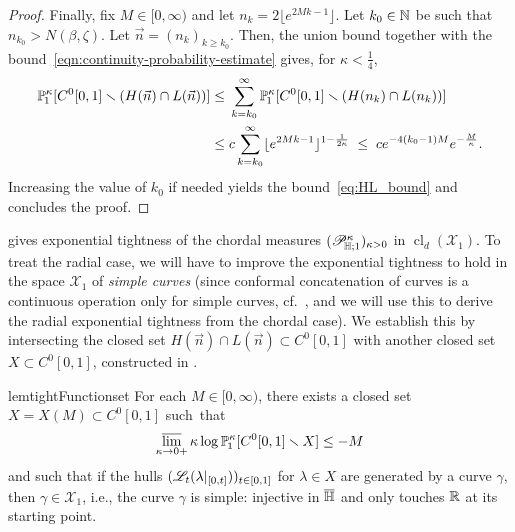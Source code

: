 \documentclass[a4paper, 11pt]{article}
\theoremstyle{definition}
\numberwithin{equation}{section}
\numberwithin{figure}{section}
\renewcommand{\limsup}{\varlimsup}
\newcommand{\cLoewnerTransform}[1][]{\mathscr{L}_{\ifx&#1&\else#1\fi}}
\newcommand{\funs}[2][]{C^{0}_{#1}[0,#2}
\newcommand{\Hpaths}[1][]{\mathscr{X}_{#1}} %
\newcommand{\Hpathscl}[1][]{\operatorname{cl}_{d}(\Hpaths[#1])}
\newcommand{\cHmeasure}[2][]{\mathscr{P}^{#2}_{\!\bH;#1}}
\newcommand{\BMmeasure}[2][]{\bP^{#2}_{\!#1}}
\begin{document}
\begin{proof}
Finally, fix $M \in [0,\infty)$ and let $n_k = 2\lfloor e^{2Mk-1} \rfloor$. Let $k_0 \in \mathbb{N}$ be such that $n_{k_0} > N(\beta,\zeta)$. 
Let $\vec n = (n_k)_{k \ge k_0}$. 
Then, the union bound together with the bound~\eqref{eqn:continuity-probability-estimate} gives, for $\kappa < \frac{1}{4}$,
\begin{align*}
\BMmeasure[1]{\kappa}[ \funs{1]} \smallsetminus (H(\vec n) \cap L(\vec n)) ] 
\le\;& \sum_{k=k_0}^\infty 
\BMmeasure[1]{\kappa}[ \funs{1]} \smallsetminus (H(n_k) \cap L(n_k)) ] \\
\le\;& c\sum_{k=k_0}^\infty \lfloor e^{2Mk-1} \rfloor^{1-\frac{1}{2\kappa}} 
\; \le\; ce^{-4(k_0-1)M}e^{-\frac{M}{\kappa}}.
\end{align*}
Increasing the value of $k_0$ if needed 
yields the bound~\eqref{eq:HL_bound} and concludes the proof. 
\end{proof}


 gives exponential tightness of the chordal measures $(\cHmeasure[1]{\kappa})_{\kappa > 0}$ in $\Hpathscl[1]$. 
To treat the radial case, we will have to improve the exponential tightness to hold in the space $\Hpaths[1]$ of \emph{simple curves} 
(since conformal concatenation of curves is a continuous operation only for simple curves, cf.~, 
and we will use this to derive the radial exponential tightness from the chordal case). 
We establish this by intersecting the closed set $H(\vec n) \cap L(\vec n) \subset \funs{1]}$ with another closed set 
$X \subset \funs{1]}$, constructed in 
.


\begin{restatable}{lem}{tightFunctionset}\label{thm:exponentially-tight-function-set}
For each $M \in [0,\infty)$, there exists a closed set $X = X(M) \subset \funs{1]}$ such~that
\begin{align}\label{eq:exponentially-tight-function-set}
\limsup_{\kappa \to 0+}\kappa\log\BMmeasure[1]{\kappa}[ \funs{1]} \smallsetminus X] \le -M 
\end{align}
and such that if the hulls $(\cLoewnerTransform[t](\lambda|_{[0,t]}))_{t \in [0,1]}$ for $\lambda \in X$ are generated by a curve $\gamma$, 
then $\gamma \in \Hpaths[1]$, i.e., the curve $\gamma$ is simple: 
injective in $\overline{\mathbb{H}}$ and only touches $\mathbb{R}$ at its starting point. 
\end{restatable}
\end{document}
